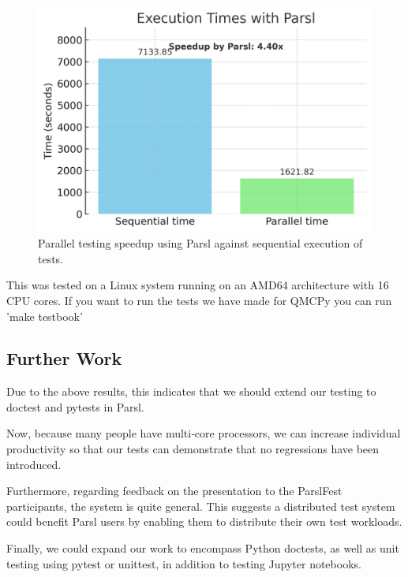 \begin{figure}[htbp]
    \centering
    \includegraphics[width=.7\textwidth]{booktests/parsl_speedup_chart_no_x_lines.png}
    \caption{Parallel testing speedup using Parsl against sequential execution of tests.}
    \label{fig:parsl_speedup}
\end{figure}

This was tested on a Linux system running on an AMD64 architecture with 16 CPU cores. If you want to run the tests we have made for QMCPy you can run 'make testbook'

\subsection{Further Work}

Due to the above results, this indicates that we should extend our testing to doctest and pytests in Parsl.

Now, because many people have multi‑core processors, we can increase individual productivity so that our tests can demonstrate that no regressions have been introduced.

Furthermore, regarding feedback on the presentation to the ParslFest participants, the system is quite general. This suggests a distributed test system could benefit Parsl users by enabling them to distribute their own test workloads.

Finally, we could expand our work to encompass Python doctests, as well as unit testing using pytest or unittest, in addition to testing Jupyter notebooks.